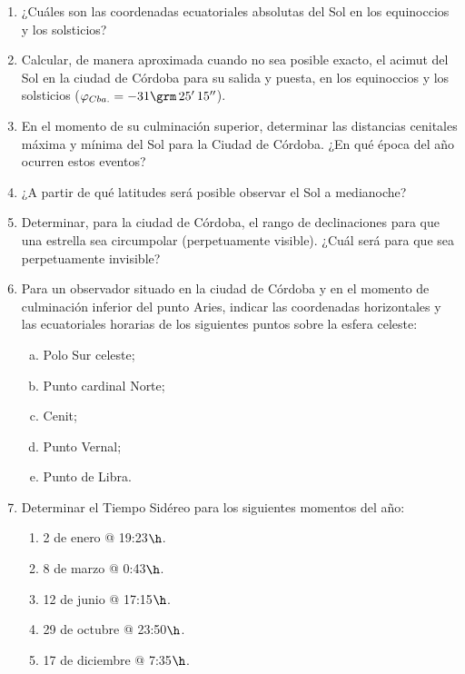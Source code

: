 \begin{enumerate}
  \item ¿Cuáles son las coordenadas ecuatoriales absolutas del Sol en los
    equinoccios y los solsticios?

  \item Calcular, de manera aproximada cuando no sea posible exacto, el acimut
    del Sol en la ciudad de Córdoba para su salida y puesta, en los equinoccios
    y los solsticios (\(\varphi_{Cba.} = -31\grm\,25'\,15''\)).

  \item En el momento de su culminación superior, determinar las distancias
    cenitales máxima y mínima del Sol para la Ciudad de Córdoba. ¿En qué época
    del año ocurren estos eventos?

  \item ¿A partir de qué latitudes será posible observar el Sol a medianoche?

  \item Determinar, para la ciudad de Córdoba, el rango de declinaciones para
    que una estrella sea circumpolar (perpetuamente visible). ¿Cuál será para
    que sea perpetuamente invisible?

  \item Para un observador situado en la ciudad de Córdoba y en el momento de
    culminación inferior del punto Aries, indicar las coordenadas horizontales y
    las ecuatoriales horarias de los siguientes puntos sobre la esfera celeste:
    \begin{enumerate}[a)]
      \item Polo Sur celeste;
      \item Punto cardinal Norte;
      \item Cenit;
      \item Punto Vernal;
      \item Punto de Libra.
    \end{enumerate}

  \item Determinar el Tiempo Sidéreo para los siguientes momentos del año:
    \begin{enumerate}
      \item 2 de enero @ 19:23$\h$.
      \item 8 de marzo @ 0:43$\h$.
      \item 12 de junio @ 17:15$\h$.
      \item 29 de octubre @ 23:50$\h$.
      \item 17 de diciembre @ 7:35$\h$.
    \end{enumerate}
    

\end{enumerate}
